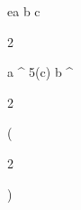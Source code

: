 \begin{eqcode}{e}{a }{}{}
  b \in {} \lend
  c \gets
  \begin{tmatrix}
  2  \lend
  \end{tmatrix} \lend
  a \gets \genar \limits ^ {5}(c) \lend
  b \gets \genar \limits ^ {  \begin{tmatrix}
  2  \lend
  \end{tmatrix} }( \begin{tmatrix}
  2  \lend
  \end{tmatrix})  \lend
\end{eqcode}
